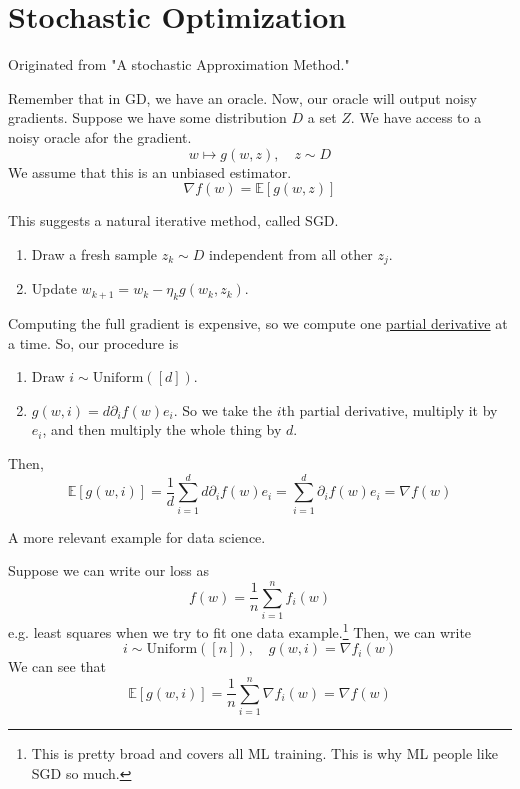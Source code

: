 \section{Stochastic Optimization}

	Originated from "A stochastic Approximation Method."

	Remember that in GD, we have an oracle. Now, our oracle will output noisy gradients. Suppose we have some distribution $D$ a set $Z$. We have access to a noisy oracle afor the gradient. 
	\begin{equation}
	  w \mapsto g(w, z), \quad z \sim D
	\end{equation}
	We assume that this is an unbiased estimator. 
	\begin{equation}
		\nabla f(w) = \mathbb{E}[g(w, z)]
	\end{equation}

	This suggests a natural iterative method, called SGD. 
	\begin{enumerate}
	  \item Draw a fresh sample $z_k \sim D$ independent from all other $z_j$. 
		\item Update $w_{k+1} = w_k - \eta_k g(w_k, z_k)$. 
	\end{enumerate}

	\begin{example}
	  \label{ex:coordinate-descent}
	  Computing the full gradient is expensive, so we compute one \hyperref[mv-def:partial-derivative]{partial derivative} at a time. So, our procedure is 
		\begin{enumerate}
			\item Draw $i \sim \mathrm{Uniform}([d])$. 
			\item $g(w, i) = d \partial_i f(w) e_i$. So we take the $i$th partial derivative, multiply it by $e_i$, and then multiply the whole thing by $d$. 
		\end{enumerate}
		Then, 
		\begin{equation}
			\mathbb{E}[g(w, i)] = \frac{1}{d} \sum_{i=1}^d d \partial_i f(w) e_i = \sum_{i=1}^d \partial_i f(w) e_i = \nabla f(w)
		\end{equation}
	\end{example}

	A more relevant example for data science. 

	\begin{example}
	  \label{ex:finite-sums}
	  Suppose we can write our loss as 
		\begin{equation}
			f(w) = \frac{1}{n} \sum_{i=1}^n f_i (w)
		\end{equation}
		e.g. least squares when we try to fit one data example.\footnote{This is pretty broad and covers all ML training. This is why ML people like SGD so much.} Then, we can write 
		\begin{equation}
			i \sim \mathrm{Uniform}([n]), \quad g(w, i) = \nabla f_i (w)
		\end{equation}
		We can see that 
		\begin{equation}
			\mathbb{E}[g(w, i)] = \frac{1}{n} \sum_{i=1}^n \nabla f_i (w) = \nabla f(w)
		\end{equation}
	\end{example}

